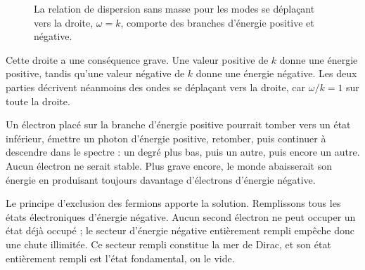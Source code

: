 \begin{figure}[htbp]
\centering
{}
\caption{La relation de dispersion sans masse pour les modes se déplaçant vers la droite, \(\omega=k\), comporte des branches d’énergie positive et négative.}
\end{figure}

Cette droite a une conséquence grave. Une valeur positive de \(k\) donne une énergie positive, tandis qu’une valeur négative de \(k\) donne une énergie négative. Les deux parties décrivent néanmoins des ondes se déplaçant vers la droite, car \(\omega/k=1\) sur toute la droite.

Un électron placé sur la branche d’énergie positive pourrait tomber vers un état inférieur, émettre un photon d’énergie positive, retomber, puis continuer à descendre dans le spectre : un degré plus bas, puis un autre, puis encore un autre. Aucun électron ne serait stable. Plus grave encore, le monde abaisserait son énergie en produisant toujours davantage d’électrons d’énergie négative.

Le principe d’exclusion des fermions apporte la solution. Remplissons tous les états électroniques d’énergie négative. Aucun second électron ne peut occuper un état déjà occupé ; le secteur d’énergie négative entièrement rempli empêche donc une chute illimitée. Ce secteur rempli constitue la mer de Dirac, et son état entièrement rempli est l’état fondamental, ou le vide.

\begin{classroomqa}
\end{classroomqa}


